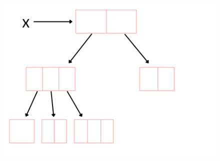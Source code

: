 \begin{flushleft}
\begin{itemize}
		\begin{figure}[h!]
			\centering
			\includegraphics[scale=.45]{content/chapter4/images/three.png}
		\end{figure}
		
		
	\end{itemize}
	
	
	
\end{flushleft}

\newpage




